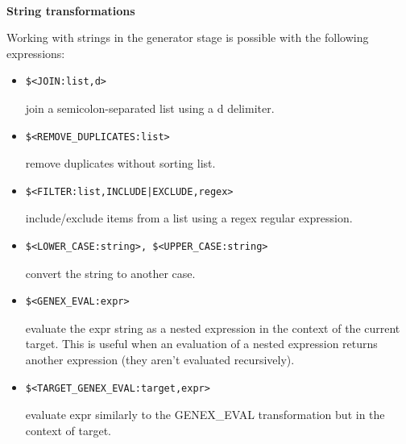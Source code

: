 \hspace*{\fill} \\ %
\noindent
\textbf{String transformations}

Working with strings in the generator stage is possible with the following expressions:

\begin{itemize}
\item 
\begin{lstlisting}[style=styleCMake]
$<JOIN:list,d> 
\end{lstlisting}

join a semicolon-separated list using a d delimiter.

\item 
\begin{lstlisting}[style=styleCMake]
$<REMOVE_DUPLICATES:list>
\end{lstlisting}

remove duplicates without sorting list.

\item 
\begin{lstlisting}[style=styleCMake]
$<FILTER:list,INCLUDE|EXCLUDE,regex>
\end{lstlisting}

include/exclude items from a list using a regex regular expression.

\item 
\begin{lstlisting}[style=styleCMake]
$<LOWER_CASE:string>, $<UPPER_CASE:string>
\end{lstlisting}

convert the string to another case.

\item 
\begin{lstlisting}[style=styleCMake]
$<GENEX_EVAL:expr>
\end{lstlisting}

evaluate the expr string as a nested expression in the context of the current target. This is useful when an evaluation of a nested expression returns another expression (they aren't evaluated recursively).

\item 
\begin{lstlisting}[style=styleCMake]
$<TARGET_GENEX_EVAL:target,expr>
\end{lstlisting}

evaluate expr similarly to the GENEX\_EVAL transformation but in the context of target.
\end{itemize}

